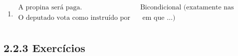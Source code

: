 \begin{enumerate}
\begin{enumerate}
				\item
			    \[\begin{array}{ll}    
				\text{A propina ser\'a paga.} & \text{Bicondicional (exatamente nas situa\c{c}\~oes} \\
				\text{O deputado vota como instru\'ido por Jo\~ao.} & \text{ em que \ldots)} \\
				\end{array}
				\]
	 
			\end{enumerate}

	\end{enumerate}


\subsection{2.2.3 Exerc\'icios}
	
